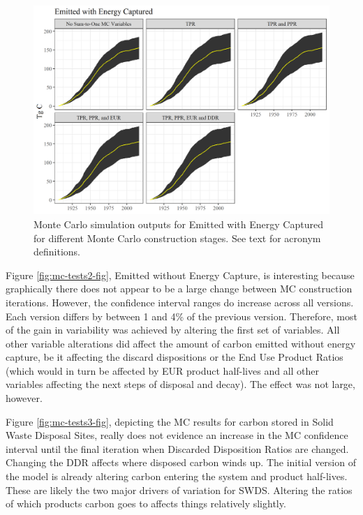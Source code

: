 \documentclass[
]{book}
\begin{document}
\begin{figure}
\includegraphics[width=1\linewidth]{images/MC_tests} \caption{Monte Carlo simulation outputs for Emitted with Energy Captured for different Monte Carlo construction stages.  See text for acronym definitions.}\label{fig:mc-tests-fig}
\end{figure}

Figure \ref{fig:mc-tests2-fig}, Emitted without Energy Capture, is interesting because graphically there does not appear to be a large change between MC construction iterations. However, the confidence interval ranges do increase across all versions. Each version differs by between 1 and 4\% of the previous version. Therefore, most of the gain in variability was achieved by altering the first set of variables. All other variable alterations did affect the amount of carbon emitted without energy capture, be it affecting the discard dispositions or the End Use Product Ratios (which would in turn be affected by EUR product half-lives and all other variables affecting the next steps of disposal and decay). The effect was not large, however.

Figure \ref{fig:mc-tests3-fig}, depicting the MC results for carbon stored in Solid Waste Disposal Sites, really does not evidence an increase in the MC confidence interval until the final iteration when Discarded Disposition Ratios are changed. Changing the DDR affects where disposed carbon winds up. The initial version of the model is already altering carbon entering the system and product half-lives. These are likely the two major drivers of variation for SWDS. Altering the ratios of which products carbon goes to affects things relatively slightly.
\end{document}
